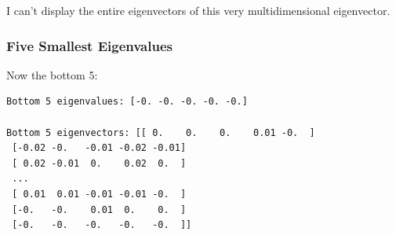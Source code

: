 \documentclass[12pt]{article}
\begin{document}
I can't display the entire eigenvectors of this very multidimensional eigenvector.

\subsubsection{Five Smallest Eigenvalues}

Now the bottom 5:
\begin{lstlisting}
Bottom 5 eigenvalues: [-0. -0. -0. -0. -0.]

Bottom 5 eigenvectors: [[ 0.    0.    0.    0.01 -0.  ]
 [-0.02 -0.   -0.01 -0.02 -0.01]
 [ 0.02 -0.01  0.    0.02  0.  ]
 ...
 [ 0.01  0.01 -0.01 -0.01 -0.  ]
 [-0.   -0.    0.01  0.    0.  ]
 [-0.   -0.   -0.   -0.   -0.  ]]
\end{lstlisting}
\end{document}
